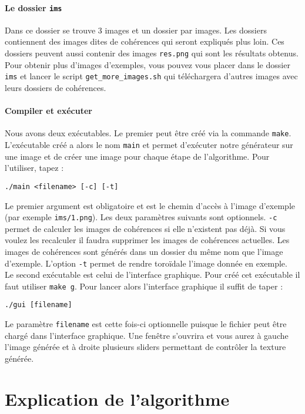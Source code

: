 \documentclass[12pt]{article}
\begin{document}
\paragraph{Le dossier \texttt{ims}}
Dans ce dossier se trouve 3 images et un dossier par images. Les dossiers contiennent des images dites de cohérences qui seront expliqués plus loin. Ces dossiers peuvent aussi contenir des images \verb|res.png| qui sont les résultats obtenus. Pour obtenir plus d'images d'exemples, vous pouvez vous placer dans le dossier \verb|ims| et lancer le script \verb|get_more_images.sh| qui téléchargera d'autres images avec leurs dossiers de cohérences.

\paragraph{Compiler et exécuter}
Nous avons deux exécutables. Le premier peut être créé via la commande \verb|make|. L'exécutable créé a alors le nom \verb|main| et permet d'exécuter notre générateur sur une image et de créer une image pour chaque étape de l'algorithme. Pour l'utiliser, tapez :
\begin{center}
	\texttt{./main <filename> [-c] [-t]}
\end{center}
Le premier argument est obligatoire et est le chemin d'accès à l'image d'exemple (par exemple \verb|ims/1.png|). Les deux paramètres suivants sont optionnels. \verb|-c| permet de calculer les images de cohérences si elle n'existent pas déjà. Si vous voulez les recalculer il faudra supprimer les images de cohérences actuelles. Les images de cohérences sont générés dans un dossier du même nom que l'image d'exemple. L'option \verb|-t| permet de rendre toroïdale l'image donnée en exemple. \\
Le second exécutable est celui de l'interface graphique. Pour créé cet exécutable il faut utiliser \verb|make g|. Pour lancer alors l'interface graphique il suffit de taper :
\begin{center}
	\verb|./gui [filename]|
\end{center}
Le paramètre \verb|filename| est cette fois-ci optionnelle puisque le fichier peut être chargé dans l'interface graphique. Une fenêtre s'ouvrira et vous aurez à gauche l'image générée et à droite plusieurs sliders permettant de contrôler la texture générée.

\section{Explication de l'algorithme}
\end{document}
